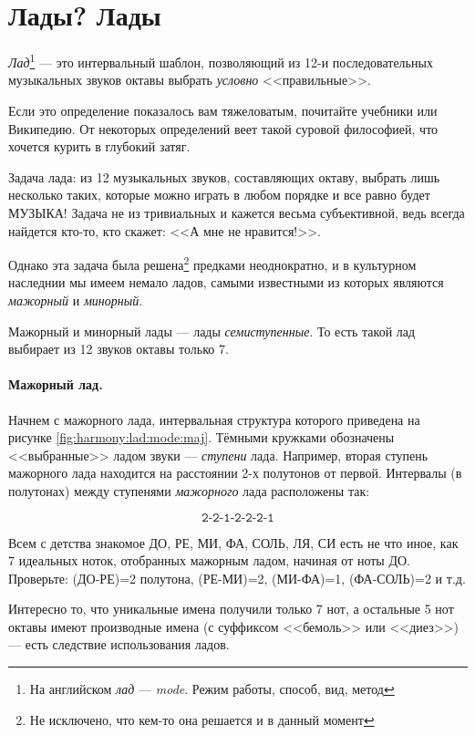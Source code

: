 \section{Лады? Лады}
\label{ch:harmony:lad}

\begin{Definition}[Лад]
    \emph{Лад}\footnote{На английском \emph{лад} --- \emph{mode}. Режим работы, способ, вид, метод} --- это интервальный шаблон, позволяющий из 12-и последовательных музыкальных звуков октавы выбрать \emph{условно} <<правильные>>. 
\end{Definition}

Если это определение показалось вам тяжеловатым, почитайте учебники или Википедию. От некоторых определений веет такой суровой философией, что хочется курить в глубокий затяг. 

Задача лада: из 12 музыкальных звуков, составляющих октаву, выбрать лишь несколько таких, которые можно играть в любом порядке и все равно будет МУЗЫКА! Задача не из тривиальных и кажется весьма субъективной, ведь всегда найдется кто-то, кто скажет: <<А мне не нравится!>>. 

Однако эта задача была решена\footnote{Не исключено, что кем-то она решается и в данный момент} предками неоднократно, и в культурном наследнии мы имеем немало ладов, самыми известными из которых являются \emph{мажорный} и \emph{минорный}.

Мажорный и минорный лады --- лады \emph{семиступенные}. То есть такой лад выбирает из 12 звуков октавы только 7.

\paragraph{Мажорный лад.} Начнем с мажорного лада, интервальная структура которого приведена на рисунке \ref{fig:harmony:lad:mode:maj}. Тёмными кружками обозначены <<выбранные>> ладом звуки --- \emph{ступени} лада. Например, вторая ступень мажорного лада находится на расстоянии 2-х полутонов от первой. Интервалы (в полутонах) между ступенями \emph{мажорного} лада расположены так:

\[
    \texttt{2-2-1-2-2-2-1}
\]

Всем с детства знакомое ДО, РЕ, МИ, ФА, СОЛЬ, ЛЯ, СИ есть не что иное, как 7 идеальных ноток, отобранных мажорным ладом, начиная от ноты ДО. Проверьте: (ДО-РЕ)=2 полутона, (РЕ-МИ)=2, (МИ-ФА)=1, (ФА-СОЛЬ)=2 и т.д. 

Интересно то, что уникальные имена получили только 7 нот, а остальные 5 нот октавы имеют производные имена (с суффиксом <<бемоль>> или <<диез>>) --- есть следствие использования ладов.

